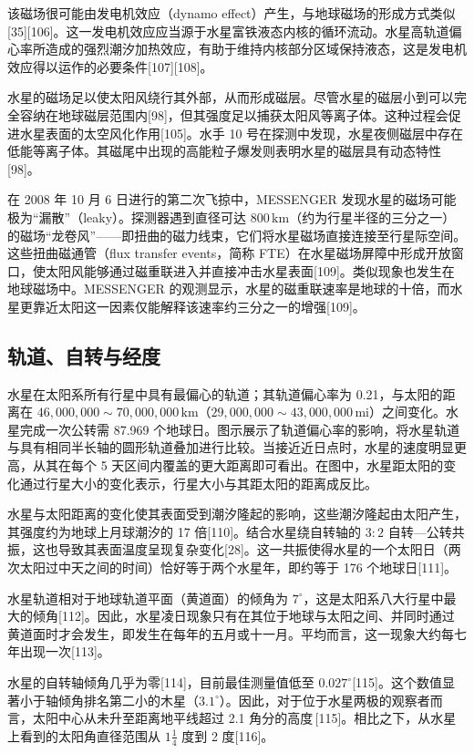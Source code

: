 该磁场很可能由发电机效应（dynamo effect）产生，与地球磁场的形成方式类似[35][106]。这一发电机效应应当源于水星富铁液态内核的循环流动。水星高轨道偏心率所造成的强烈潮汐加热效应，有助于维持内核部分区域保持液态，这是发电机效应得以运作的必要条件[107][108]。

水星的磁场足以使太阳风绕行其外部，从而形成磁层。尽管水星的磁层小到可以完全容纳在地球磁层范围内[98]，但其强度足以捕获太阳风等离子体。这种过程会促进水星表面的太空风化作用[105]。水手 10 号在探测中发现，水星夜侧磁层中存在低能等离子体。其磁尾中出现的高能粒子爆发则表明水星的磁层具有动态特性[98]。

在 2008 年 10 月 6 日进行的第二次飞掠中，MESSENGER 发现水星的磁场可能极为“漏散”（leaky）。探测器遇到直径可达 \(800\,\mathrm{km}\)（约为行星半径的三分之一）的磁场“龙卷风”——即扭曲的磁力线束，它们将水星磁场直接连接至行星际空间。这些扭曲磁通管（flux transfer events，简称 FTE）在水星磁场屏障中形成开放窗口，使太阳风能够通过磁重联进入并直接冲击水星表面[109]。类似现象也发生在地球磁场中。MESSENGER 的观测显示，水星的磁重联速率是地球的十倍，而水星更靠近太阳这一因素仅能解释该速率约三分之一的增强[109]。
\subsection{轨道、自转与经度}
水星在太阳系所有行星中具有最偏心的轨道；其轨道偏心率为 0.21，与太阳的距离在 \(46{,}000{,}000\sim70{,}000{,}000\,\mathrm{km}\)（\(29{,}000{,}000\sim43{,}000{,}000\,\mathrm{mi}\)）之间变化。水星完成一次公转需 87.969 个地球日。图示展示了轨道偏心率的影响，将水星轨道与具有相同半长轴的圆形轨道叠加进行比较。当接近近日点时，水星的速度明显更高，从其在每个 5 天区间内覆盖的更大距离即可看出。在图中，水星距太阳的变化通过行星大小的变化表示，行星大小与其距太阳的距离成反比。

水星与太阳距离的变化使其表面受到潮汐隆起的影响，这些潮汐隆起由太阳产生，其强度约为地球上月球潮汐的 17 倍[110]。结合水星绕自转轴的 \(3:2\) 自转—公转共振，这也导致其表面温度呈现复杂变化[28]。这一共振使得水星的一个太阳日（两次太阳过中天之间的时间）恰好等于两个水星年，即约等于 176 个地球日[111]。

水星轨道相对于地球轨道平面（黄道面）的倾角为 \(7^{\circ}\)，这是太阳系八大行星中最大的倾角[112]。因此，水星凌日现象只有在其位于地球与太阳之间、并同时通过黄道面时才会发生，即发生在每年的五月或十一月。平均而言，这一现象大约每七年出现一次[113]。

水星的自转轴倾角几乎为零[114]，目前最佳测量值低至 \(0.027^{\circ}\)[115]。这个数值显著小于轴倾角排名第二小的木星（\(3.1^{\circ}\)）。因此，对于位于水星两极的观察者而言，太阳中心从未升至距离地平线超过 2.1 角分的高度\,[115]。相比之下，从水星上看到的太阳角直径范围从 \(1\tfrac{1}{4}\) 度到 2 度[116]。

























